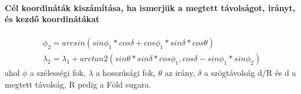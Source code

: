 \paragraph{Cél koordináták kiszámítása, ha ismerjük a megtett távolságot, irányt, és kezdő koordinátákat}
\begin{gather}
    \phi_{2} = arcsin(sin \phi_{1} * cos \delta + cos \phi_{1} * sin \delta * cos \theta)\\
    \lambda_{2} = \lambda_{1} + arctan2(sin\theta * sin\delta  * cos\phi_{1}, cos\delta - sin\phi_{1} * sin\phi_{2})
\end{gather}
ahol $\phi$ a szélességi fok, $\lambda$ a hosszúsági fok, $\theta$ az irány, $\delta$ a szögtávolság d/R és d a megtett távolság, R pedig a Föld sugara.

